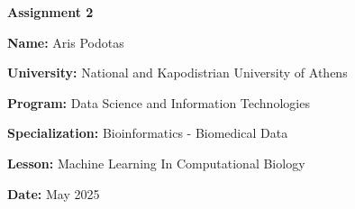 \documentclass[12pt, a4paper]{article}
\author{Aris Podotas}
\date{today}
\begin{document}
\begin{titlepage}
    \centering
    {\huge \textbf{Assignment 2}\par}
    \vspace{0.5cm}
    {\Large \textbf{Name:} Aris Podotas\par}
    \vspace{0.5cm}
    {\large \textbf{University:} National and Kapodistrian University of Athens\par}
    \vspace{0.5cm}
    {\large \textbf{Program:} Data Science and Information Technologies\par}
    \vspace{0.5cm}
    {\large \textbf{Specialization:} Bioinformatics - Biomedical Data\par}
    \vspace{0.5cm}
    {\large \textbf{Lesson:} Machine Learning In Computational Biology\par}
    \vspace{0.5cm}
    {\large \textbf{Date:} May 2025\par}
    \tableofcontents
\end{titlepage}
\end{document}
